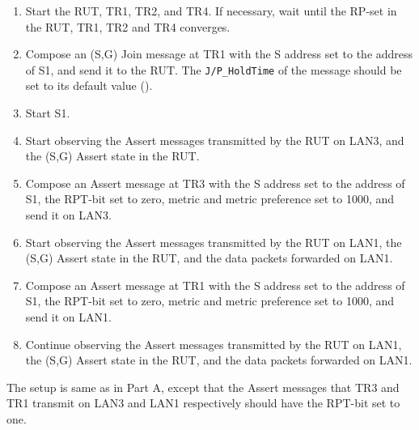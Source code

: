\documentclass[11pt]{report}
\begin{document}


\begin{enumerate}

  \item Start the RUT, TR1, TR2, and TR4. If necessary, wait until the RP-set
  in the RUT, TR1, TR2 and TR4 converges.

  \item Compose an (S,G) Join message at TR1 with the S address set to the
  address of S1, and send it to the RUT.
  The \verb=J/P_HoldTime= of the message should be set to its default
  value ({\PimsmJPHoldTime}).

  \item Start S1.

  \item Start observing the Assert messages transmitted by the RUT on
  LAN3, and the (S,G) Assert state in the RUT.

  \item Compose an Assert message at TR3 with the S address set to the
  address of S1, the RPT-bit set to zero, metric and metric preference set to
  1000, and send it on LAN3.

  \item Start observing the Assert messages transmitted by the RUT on
  LAN1, the (S,G) Assert state in the RUT, and the data packets forwarded on
  LAN1. 

  \item Compose an Assert message at TR1 with the S address set to the
  address of S1, the RPT-bit set to zero, metric and metric preference set to
  1000, and send it on LAN1.

  \item Continue observing the Assert messages transmitted by the RUT on
  LAN1, the (S,G) Assert state in the RUT, and the data packets forwarded on
  LAN1.

\end{enumerate}


The setup is same as in Part A, except that the Assert messages that TR3 and
TR1 transmit on LAN3 and LAN1 respectively should have the RPT-bit set to one.

\end{document}

